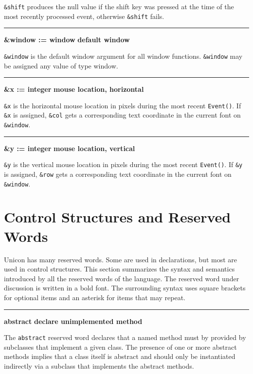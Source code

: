 \noindent
\texttt{\&shift} produces the null value if the shift key was pressed at
the time of the most recently processed event, otherwise
\texttt{\&shift} fails.

\bigskip\hrule\vspace{0.1cm}
\noindent
{\bf \&window := window } \hfill {\bf default window}

\noindent
\texttt{\&window} is the default window argument for all window
functions. \texttt{\&window} may be assigned any value of type
window.

\bigskip\hrule\vspace{0.1cm}
\noindent
{\bf \&x := integer } \hfill {\bf mouse location, horizontal}

\noindent
\texttt{\&x} is the horizontal mouse location in pixels during the most
recent \texttt{Event()}. If \texttt{\&x} is assigned, \texttt{\&col}
gets a corresponding text coordinate in the current font on
\texttt{\&window}.

\bigskip\hrule\vspace{0.1cm}
\noindent
{\bf \&y := integer } \hfill {\bf mouse location, vertical}

\noindent
\texttt{\&y} is the vertical mouse location in pixels during the most
recent \texttt{Event()}. If \texttt{\&y} is assigned, \texttt{\&row}
gets a corresponding text coordinate in the current font on
\texttt{\&window}.

\section{Control Structures and Reserved Words}

Unicon has many reserved words. Some are used in
declarations, but most are used in control
structures. This section summarizes the syntax and semantics
introduced by all the reserved words of the language. The reserved
word under discussion is written in a bold font. The surrounding
syntax uses square brackets for optional items and an asterisk for
items that may repeat.

\bigskip\hrule\vspace{0.1cm}
\noindent
{\bf abstract} \hfill {\bf declare unimplemented method}

\noindent
The \texttt{abstract} reserved word declares that a
named method must by provided by subclasses that implement a given
class. The presence of one or more abstract methods implies that a
class itself is abstract and should only be instantiated indirectly
via a subclass that implements the abstract methods.


